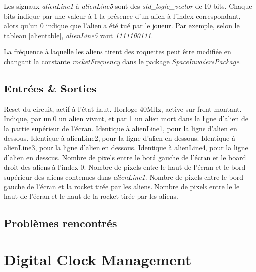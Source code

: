 \documentclass[french]{nakrule}
\begin{document}
Les signaux \emph{alienLine1} à \emph{alienLine5} sont des
\emph{std\_logic\_vector} de 10 bits. Chaque bits indique par une valeur à 1 la
présence d'un alien à l'index correspondant, alors qu'un 0 indique que l'alien a
été tué par le joueur. Par exemple, selon le tableau \ref{alientable},
\emph{alienLine5} vaut \emph{1111100111}.

La fréquence à laquelle les aliens tirent des roquettes peut être modifiée en
changant la constante \emph{rocketFrequency} dans le package \emph{SpaceInvadersPackage}.

\clearpage

\subsection{Entrées \& Sorties}
\label{subsec:Entrées_Sorties_alienRocket}

\begin{descr}
   Reset du circuit, actif à l'état haut.
   Horloge 40MHz, active sur front montant.
   Indique, par un 0 un alien vivant, et par 1 un alien
  mort dans la ligne d'alien de la partie supérieur de l'écran.
   Identique à alienLine1, pour la ligne d'alien en dessous.
   Identique à alienLine2, pour la ligne d'alien en dessous.
   Identique à alienLine3, pour la ligne d'alien en dessous.
   Identique à alienLine4, pour la ligne d'alien en dessous.
   Nombre de pixels entre le bord gauche de l'écran et le
  board droit des aliens à l'index 0.
   Nombre de pixels entre le haut de l'écran et le bord
  supérieur des aliens contenues dans \emph{alienLine1}.
   Nombre de pixels entre le bord gauche de l'écran et
  la rocket tirée par les aliens.
   Nombre de pixels entre le le haut de l'écran et le
  haut de la rocket tirée par les aliens.
\end{descr}

\subsection{Problèmes rencontrés}
\label{subsec:Problèmes_rencontrés_alienRocket}



\clearpage

\section{Digital Clock Management}
\label{sec:dcm}
\end{document}
